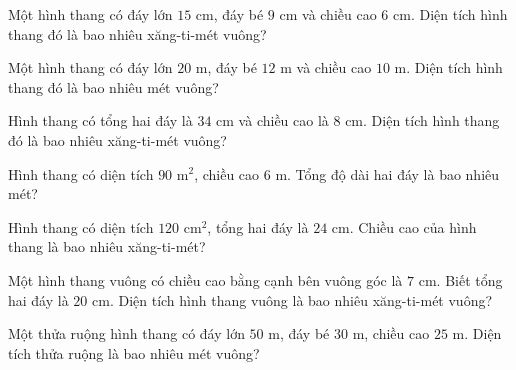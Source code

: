 
\begin{ex}
  Một hình thang có đáy lớn $15\text{ cm}$, đáy bé $9\text{ cm}$ và chiều cao $6\text{ cm}$. Diện tích hình thang đó là bao nhiêu xăng-ti-mét vuông?
\end{ex}

\begin{ex}
  Một hình thang có đáy lớn $20\text{ m}$, đáy bé $12\text{ m}$ và chiều cao $10\text{ m}$. Diện tích hình thang đó là bao nhiêu mét vuông?
\end{ex}

\begin{ex}
  Hình thang có tổng hai đáy là $34\text{ cm}$ và chiều cao là $8\text{ cm}$. Diện tích hình thang đó là bao nhiêu xăng-ti-mét vuông?
\end{ex}

\begin{ex}
  Hình thang có diện tích $90\text{ m}^2$, chiều cao $6\text{ m}$. Tổng độ dài hai đáy là bao nhiêu mét?
\end{ex}

\begin{ex}
  Hình thang có diện tích $120\text{ cm}^2$, tổng hai đáy là $24\text{ cm}$. Chiều cao của hình thang là bao nhiêu xăng-ti-mét?
\end{ex}

\begin{ex}
  Một hình thang vuông có chiều cao bằng cạnh bên vuông góc là $7\text{ cm}$. Biết tổng hai đáy là $20\text{ cm}$. Diện tích hình thang vuông là bao nhiêu xăng-ti-mét vuông?
\end{ex}

\begin{ex}
  Một thửa ruộng hình thang có đáy lớn $50\text{ m}$, đáy bé $30\text{ m}$, chiều cao $25\text{ m}$. Diện tích thửa ruộng là bao nhiêu mét vuông?
\end{ex}

